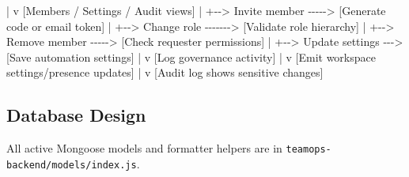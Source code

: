\documentclass[
]{article}
\newenvironment{Shaded}{}{}
\newcommand{\NormalTok}[1]{#1}
\begin{document}
\begin{Shaded}
\begin{Highlighting}[]
\NormalTok{[Owner/Admin]}
\NormalTok{   |}
\NormalTok{   v}
\NormalTok{[Members / Settings / Audit views]}
\NormalTok{   |}
\NormalTok{   +{-}{-}\textgreater{} Invite member {-}{-}{-}{-}{-}\textgreater{} [Generate code or email token]}
\NormalTok{   |}
\NormalTok{   +{-}{-}\textgreater{} Change role {-}{-}{-}{-}{-}{-}{-}\textgreater{} [Validate role hierarchy]}
\NormalTok{   |}
\NormalTok{   +{-}{-}\textgreater{} Remove member {-}{-}{-}{-}{-}\textgreater{} [Check requester permissions]}
\NormalTok{   |}
\NormalTok{   +{-}{-}\textgreater{} Update settings {-}{-}{-}\textgreater{} [Save automation settings]}
\NormalTok{                                |}
\NormalTok{                                v}
\NormalTok{                         [Log governance activity]}
\NormalTok{                                |}
\NormalTok{                                v}
\NormalTok{                         [Emit workspace settings/presence updates]}
\NormalTok{                                |}
\NormalTok{                                v}
\NormalTok{                         [Audit log shows sensitive changes]}
\end{Highlighting}
\end{Shaded}

\subsection{Database Design}\label{database-design}

All active Mongoose models and formatter helpers are in
\texttt{teamops-backend/models/index.js}.
\end{document}
